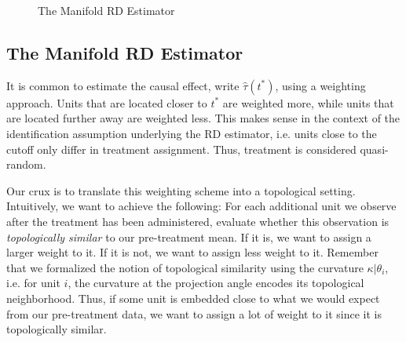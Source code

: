 \documentclass[twoside,11pt]{article}
\begin{document}
\begin{figure}[h!]
\begin{center}
  \end{center}
  \caption{The Manifold RD Estimator}\label{fig:manifold-rd}
\end{figure}

\subsection{The Manifold RD Estimator}

It is common to estimate the causal effect, write $\hat{\tau}(t^*)$, using a weighting approach. Units that are located closer to $t^*$ are weighted more, while units that are located further away are weighted less. This makes sense in the context of the identification assumption underlying the RD estimator, i.e. units close to the cutoff only differ in treatment assignment. Thus, treatment is considered quasi-random. 

Our crux is to translate this weighting scheme into a topological setting. Intuitively, we want to achieve the following: For each additional unit we observe after the treatment has been administered, evaluate whether this observation is \textit{topologically similar} to our pre-treatment mean. If it is, we want to assign a larger weight to it. If it is not, we want to assign less weight to it. Remember that we formalized the notion of topological similarity using the curvature $\kappa|\theta_i$, i.e. for unit $i$, the curvature at the projection angle encodes its topological neighborhood. Thus, if some unit is embedded close to what we would expect from our pre-treatment data, we want to assign a lot of weight to it since it is topologically similar. 
\end{document}
